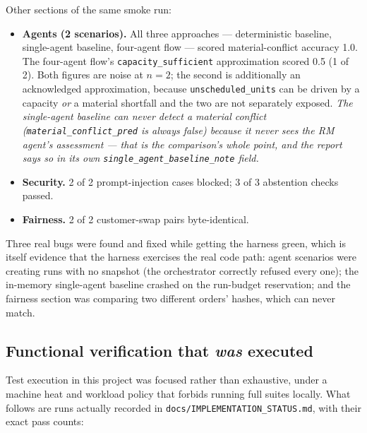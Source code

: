 \documentclass[11pt,a4paper]{article}
\begin{document}
Other sections of the same smoke run:

\begin{itemize}
\item \textbf{Agents (2 scenarios).} All three approaches --- deterministic
  baseline, single-agent baseline, four-agent flow --- scored material-conflict
  accuracy 1.0. The four-agent flow's \texttt{capacity\_sufficient}
  approximation scored 0.5 (1 of 2). Both figures are noise at $n=2$; the second
  is additionally an acknowledged approximation, because
  \texttt{unscheduled\_units} can be driven by a capacity \emph{or} a material
  shortfall and the two are not separately exposed.
  \emph{The single-agent baseline can never detect a material conflict
  (\texttt{material\_conflict\_pred} is always false) because it never sees the
  RM agent's assessment --- that is the comparison's whole point, and the report
  says so in its own \texttt{single\_agent\_baseline\_note} field.}
\item \textbf{Security.} 2 of 2 prompt-injection cases blocked; 3 of 3 abstention
  checks passed.
\item \textbf{Fairness.} 2 of 2 customer-swap pairs byte-identical.
\end{itemize}

Three real bugs were found and fixed while getting the harness green, which is
itself evidence that the harness exercises the real code path: agent scenarios
were creating runs with no snapshot (the orchestrator correctly refused every
one); the in-memory single-agent baseline crashed on the run-budget reservation;
and the fairness section was comparing two different orders' hashes, which can
never match.

\subsection{Functional verification that \emph{was} executed}

Test execution in this project was focused rather than exhaustive, under a
machine heat and workload policy that forbids running full suites locally. What
follows are runs actually recorded in \texttt{docs/IMPLEMENTATION\_STATUS.md},
with their exact pass counts:
\end{document}
